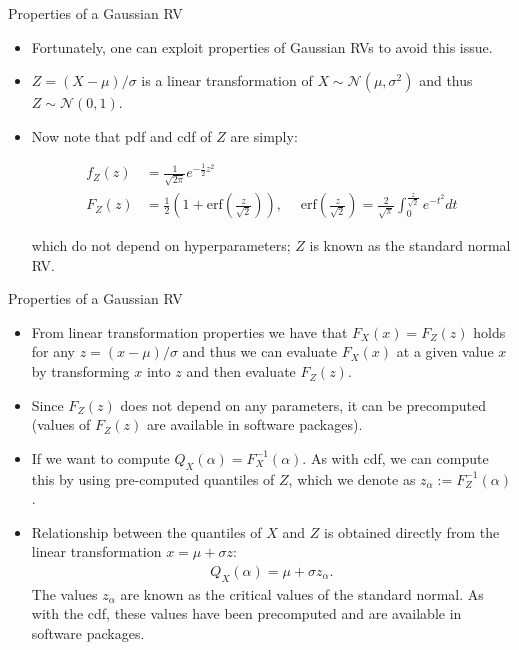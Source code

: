 \documentclass[handout,9pt]{beamer}
\begin{document}
%
\begin{frame}{Properties of a Gaussian RV}

\begin{itemize}
\setlength{\itemsep}{10pt}
\item Fortunately, one can exploit properties of Gaussian RVs to avoid this issue. 

\item $Z=(X-\mu)/\sigma$ is a linear transformation of $X\sim \mathcal{N}(\mu,\sigma^2)$ and thus $Z\sim \mathcal{N}(0,1)$. 

\item Now note that pdf and cdf of $Z$ are simply:
\begin{block}{}
\begin{align*}
f_Z(z)&=\frac{1}{\sqrt{2\pi}}e^{-\frac{1}{2}z^2}\\
F_Z\left(z\right)&=\frac{1}{2}\left(1+\textrm{erf}\left(\frac{z}{\sqrt{2}}\right)\right),\; \quad \textrm{erf}\left(\frac{z}{\sqrt{2}}\right)=\frac{2}{\sqrt{\pi}}\int_0^{\frac{z}{\sqrt{2}}}e^{-t^2}dt
\end{align*}
\end{block}
which do not depend on hyperparameters; $Z$ is known as the standard normal RV. 
\end{itemize}

\end{frame}


%
\begin{frame}{Properties of a Gaussian RV}

\begin{itemize}
\setlength{\itemsep}{10pt}
\item From linear transformation properties we have that $F_X(x)=F_Z(z)$ holds for any $z=(x-\mu)/\sigma$ and thus we can evaluate $F_X(x)$ at a given value $x$ by transforming $x$ into $z$ and then evaluate $F_Z(z)$. 

\item Since $F_Z(z)$ does not depend on any parameters, it can be precomputed (values of $F_Z(z)$ are available in software packages). 

\item If we want to compute $Q_X(\alpha)=F^{-1}_X(\alpha)$. As with cdf, we can compute this by using pre-computed quantiles of $Z$, which we denote as $z_\alpha:=F_Z^{-1}(\alpha)$. 

\item Relationship between the quantiles of $X$ and $Z$ is obtained directly from the linear transformation $x=\mu+\sigma z$:
\begin{align*}
Q_X(\alpha)=\mu+\sigma z_\alpha.
\end{align*}
The values $z_\alpha$ are known as the critical values of the standard normal. As with the cdf, these values have been precomputed and are available in software packages. 
\end{itemize}

\end{frame}
\end{document}
